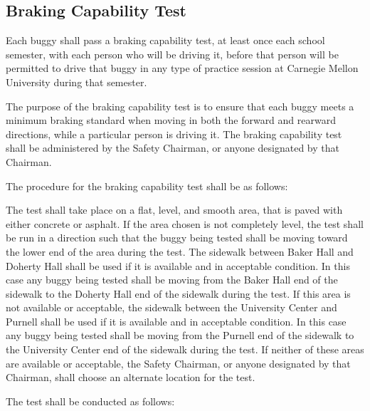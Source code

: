 \subsection{Braking Capability Test}

	Each buggy shall pass a braking capability test, at least once each school
	semester, with each person who will be driving it, before that person will be
	permitted to drive that buggy in any type of practice session at Carnegie
	Mellon University during that semester.

	The purpose of the braking capability test is to ensure that each buggy meets a
	minimum braking standard when moving in both the forward and rearward
	directions, while a particular person is driving it. The braking capability
	test shall be administered by the Safety Chairman, or anyone designated by that
	Chairman. 
	\newline

	\noindent The procedure for the braking capability test shall be as follows:

	The test shall take place on a flat, level, and smooth area, that is paved with
	either concrete or asphalt. If the area chosen is not completely level, the
	test shall be run in a direction such that the buggy being tested shall be
	moving toward the lower end of the area during the test. The sidewalk between
	Baker Hall and Doherty Hall shall be used if it is available and in acceptable
	condition. In this case any buggy being tested shall be moving from the Baker
	Hall end of the sidewalk to the Doherty Hall end of the sidewalk during the
	test. If this area is not available or acceptable, the sidewalk between the
	University Center and Purnell shall be used if it is available and in
	acceptable condition. In this case any buggy being tested shall be moving from
	the Purnell end of the sidewalk to the University Center end of the sidewalk
	during the test. If neither of these areas are available or acceptable, the
	Safety Chairman, or anyone designated by that Chairman, shall choose an
	alternate location for the test.
	\newline

	\noindent The test shall be conducted as follows:

